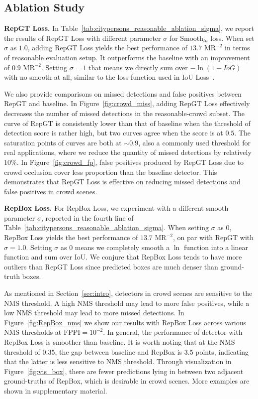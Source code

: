 \documentclass[10pt,twocolumn,letterpaper]{article}
\newcommand{\myparagraph}[1]{{\vspace{0.5em} \noindent \bf #1}}
\begin{document}
\subsection{Ablation Study}
\label{subsec:ablationexperiments}

\myparagraph{RepGT Loss.} In Table~\ref{tab:citypersons_reasonable_ablation_sigma}, we report the results of RepGT Loss with different parameter $\sigma$ for $\mathrm{Smooth}_{ln}$ loss. When set $\sigma$ as $1.0$, adding RepGT Loss yields the best performance of $13.7$ $\mathrm{MR}^{-2}$ in terms of reasonable evaluation setup. It outperforms the baseline with an improvement of $0.9$ $\mathrm{MR}^{-2}$. Setting $\sigma=1$ that means we directly sum over $-\ln{(1-IoG)}$ with no smooth at all, similar to the loss function used in IoU Loss~\cite{yu2016unitbox}.

We also provide comparisons on missed detections and false positives between RepGT and baseline. In Figure~\ref{fig:crowd_miss}, adding RepGT Loss effectively decreases the number of missed detections in the reasonable-crowd subset. The curve of RepGT is consistently lower than that of baseline when the threshold of detection score is rather high, but two curves agree when the score is at $0.5$. The saturation points of curves are both at $\sim{}0.9$, also a commonly used threshold for real applications, where we reduce the quantity of missed detections by relatively $10\%$. In Figure~\ref{fig:crowd_fp}, false positives produced by RepGT Loss due to crowd occlusion cover less proportion than the baseline detector. This demonstrates that RepGT Loss is effective on reducing missed detections and false positives in crowd scenes.

\myparagraph{RepBox Loss.} For RepBox Loss, we experiment with a different smooth parameter $\sigma$, reported in the fourth line of Table~\ref{tab:citypersons_reasonable_ablation_sigma}. When setting $\sigma$ as $0$, RepBox Loss yields the best performance of $13.7$ $\mathrm{MR}^{-2}$, on par with RepGT with $\sigma=1.0$. Setting $\sigma$ as 0 means we completely smooth a $\ln$ function into a linear function and sum over IoU. We conjure that RepBox Loss tends to have more outliers than RepGT Loss since predicted boxes are much denser than ground-truth boxes.

As mentioned in Section~\ref{sec:intro}, detectors in crowd scenes are sensitive to the NMS threshold. A high NMS threshold may lead to more false positives, while a low NMS threshold may lead to more missed detections. In Figure~\ref{fig:RepBox_nms} we show our results with RepBox Loss across various NMS thresholds at $\mathrm{FPPI}=10^{-2}$. In general, the performance of detector with RepBox Loss is smoother than baseline. It is worth noting that at the NMS threshold of $0.35$, the gap between baseline and RepBox is $3.5$ points, indicating that the latter is less sensitive to NMS threshold. Through visualization in Figure~\ref{fig:vis_box}, there are fewer predictions lying in between two adjacent ground-truths of RepBox, which is desirable in crowd scenes. More examples are shown in supplementary material.
\end{document}
